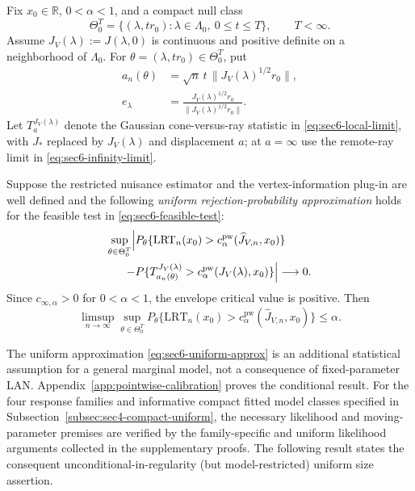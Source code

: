 \begin{theorem}
\label{thm:sec6-uniform-size}
Fix $x_0\in\mathbb R$, $0<\alpha<1$, and a compact
null class
\[
\Theta_0^T=\{(\lambda,t r_0):
\lambda\in\Lambda_0,\ 0\le t\le T\},\qquad T<\infty.
\]
Assume $J_V(\lambda):=J(\lambda,0)$ is continuous and
positive definite on a neighborhood of $\Lambda_0$.
For $\theta=(\lambda,t r_0)\in\Theta_0^T$, put
\begin{equation}\label{eq:sec6-uniform-displacement}
\begin{aligned}
 a_n(\theta)&=\sqrt n\,t\,
 \|J_V(\lambda)^{1/2}r_0\|,\\
 e_\lambda&=\frac{J_V(\lambda)^{1/2}r_0}
 {\|J_V(\lambda)^{1/2}r_0\|}.
\end{aligned}
\end{equation}
Let $T_a^{J_V(\lambda)}$ denote the Gaussian
cone-versus-ray statistic in
\eqref{eq:sec6-local-limit}, with $J_*$ replaced by
$J_V(\lambda)$ and displacement $a$; at $a=\infty$
use the remote-ray limit in
\eqref{eq:sec6-infinity-limit}.

Suppose the restricted nuisance estimator and the
vertex-information plug-in are well defined and the
following \emph{uniform rejection-probability approximation}
holds for the feasible test in
\eqref{eq:sec6-feasible-test}:
\begin{equation}\label{eq:sec6-uniform-approx}
\begin{aligned}
\sup_{\theta\in\Theta_0^T}\Bigl|
&P_\theta\{\mathrm{LRT}_n(x_0)>
 c_\alpha^{\mathrm{pw}}(\widehat J_{V,n},x_0)\}\\
-&P\{T_{a_n(\theta)}^{J_V(\lambda)}>
 c_\alpha^{\mathrm{pw}}(J_V(\lambda),x_0)\}
\Bigr|\longrightarrow0.
\end{aligned}
\end{equation}
Since $c_{\infty,\alpha}>0$ for $0<\alpha<1$,
the envelope critical value is positive. Then
\begin{equation}\label{eq:sec6-uniform-size}
\boxed{\displaystyle
\limsup_{n\to\infty}\sup_{\theta\in\Theta_0^T}
P_\theta\{\mathrm{LRT}_n(x_0)>
 c_\alpha^{\mathrm{pw}}(\widehat J_{V,n},x_0)\}
\le\alpha.}
\end{equation}
\end{theorem}

The uniform approximation
\eqref{eq:sec6-uniform-approx} is an additional statistical
assumption for a general marginal model, not a consequence
of fixed-parameter LAN. Appendix~\ref{app:pointwise-calibration}
proves the conditional result. For the four response families
and informative compact fitted model classes specified in
Subsection~\ref{subsec:sec4-compact-uniform}, the necessary
likelihood and moving-parameter premises are verified by
the family-specific and uniform likelihood arguments
collected in the supplementary proofs. The following result
states the consequent unconditional-in-regularity (but
model-restricted) uniform size assertion.

